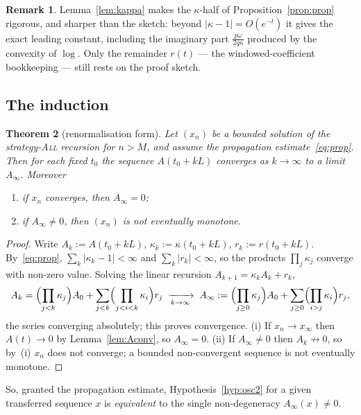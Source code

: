 \documentclass[11pt]{article}
\newtheorem{theorem}{Theorem}[section]
\theoremstyle{definition}
\newtheorem{remark}[theorem]{Remark}
\newcommand{\All}{\textsc{All}}
\begin{document}
\begin{remark}
  Lemma~\ref{lem:kappa} makes the $\kappa$-half of
  Proposition~\ref{prop:prop} rigorous, and sharper than the sketch:
  beyond $|\kappa-1|=O(e^{-t})$ it gives the exact leading constant,
  including the imaginary part $\tfrac{p\omega}{2qn}$ produced by the
  convexity of $\log$. Only the remainder $r(t)$ --- the
  windowed-coefficient bookkeeping --- still rests on the proof
  sketch.
\end{remark}

\subsection{The induction}

\begin{theorem}[renormalisation form]\label{thm:renorm}
  Let $(x_n)$ be a bounded solution of the strategy-\All{} recursion
  for $n>M$, and assume the propagation estimate~\eqref{eq:prop}.
  Then for each fixed $t_0$ the sequence $A(t_0+kL)$ converges as
  $k\to\infty$ to a limit $A_\infty$. Moreover
  \begin{enumerate}[label=\rm(\roman*),leftmargin=2.4em]
  \item if $x_n$ converges, then $A_\infty=0$;
  \item if $A_\infty\ne0$, then $(x_n)$ is not eventually monotone.
  \end{enumerate}
\end{theorem}

\begin{proof}
  Write $A_k:=A(t_0+kL)$, $\kappa_k:=\kappa(t_0+kL)$,
  $r_k:=r(t_0+kL)$. By~\eqref{eq:prop}, $\sum_k|\kappa_k-1|<\infty$
  and $\sum_k|r_k|<\infty$, so the products
  $\prod_{j}\kappa_j$ converge with non-zero value. Solving the
  linear recursion $A_{k+1}=\kappa_kA_k+r_k$,
  \[
    A_k=\Bigl(\prod_{j<k}\kappa_j\Bigr)A_0
       +\sum_{j<k}\Bigl(\prod_{j<i<k}\kappa_i\Bigr)r_j
       \;\xrightarrow[k\to\infty]{}\;
       A_\infty:=\Bigl(\prod_{j\ge0}\kappa_j\Bigr)A_0
       +\sum_{j\ge0}\Bigl(\prod_{i>j}\kappa_i\Bigr)r_j,
  \]
  the series converging absolutely; this proves convergence.
  (i) If $x_n\to x_\infty$ then $A(t)\to0$ by
  Lemma~\ref{lem:Aconv}, so $A_\infty=0$. (ii) If $A_\infty\ne0$ then
  $A_k\not\to0$, so by~(i) $x_n$ does not converge; a bounded
  non-convergent sequence is not eventually monotone.
\end{proof}

So, granted the propagation estimate, Hypothesis~\ref{hyp:osc2} for a
given transferred sequence $x$ is \emph{equivalent} to the single
non-degeneracy $A_\infty(x)\ne0$.
\end{document}
